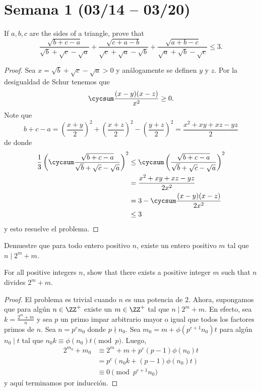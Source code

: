 \section{Semana 1 (03/14 -- 03/20)}


\begin{probEG}[ISL 2006/A5]
  If $a,b,c$ are the sides of a triangle, prove that
  \[
    \frac{\sqrt{b+c-a}}{\sqrt b+\sqrt c-\sqrt a}
    +\frac{\sqrt{c+a-b}}{\sqrt c+\sqrt a-\sqrt b}
    +\frac{\sqrt{a+b-c}}{\sqrt a+\sqrt b-\sqrt c}
    \le 3.
  \]
\end{probEG}

\begin{proof}
  Sea $x=\sqrt b+\sqrt c-\sqrt a>0$ y análogamente se definen $y$ y $z$. Por la
  desigualdad de Schur tenemos que
  \[\cycsum\frac{(x-y)(x-z)}{x^2}\ge 0.\]
  Note que
  \[
    b+c-a
    =\left(\frac{x+y}{2}\right)^2
    +\left(\frac{x+z}{2}\right)^2
    -\left(\frac{y+z}{2}\right)^2
    =\frac{x^2+xy+xz-yz}{2}
  \]
  de donde
  \begin{align*}
    \frac13\left(\cycsum\frac{\sqrt{b+c-a}}{\sqrt b+\sqrt c-\sqrt a}\right)^2
    &\le \cycsum\left(\frac{\sqrt{b+c-a}}{\sqrt b+\sqrt c-\sqrt a}\right)^2 \\
    &= \frac{x^2+xy+xz-yz}{2x^2} \\
    &= 3-\cycsum\frac{(x-y)(x-z)}{2x^2} \\
    &\le 3
  \end{align*}
  y esto resuelve el problema.
\end{proof}

\begin{probEB}[ISL 2006/N7]
  Demuestre que para todo entero positivo $n$, existe un entero positivo $m$ tal
  que $n\mid 2^m+m$.
  \begin{hint}
    For all positive integers $n$, show that there exists a positive integer $m$
    such that $n$ divides $2^m+m$.
  \end{hint}
\end{probEB}

\begin{proof}
  El problema es trivial cuando $n$ es una potencia de $2$. Ahora, supongamos
  que para algún $n\in\ZZ^+$ existe un $m\in\ZZ^+$ tal que $n\mid 2^m+m$. En
  efecto, sea $k=\frac{2^m+m}{n}$ y sea $p$ un primo impar arbitrario mayor o
  igual que todos los factores primos de $n$. Sea $n=p^en_0$ donde $p\nmid n_0$.
  Sea $m_0=m+\phi(p^{e+1}n_0)t$ para algún $n_0\mid t$ tal que
  $n_0k\equiv\phi(n_0)t\pmod p$. Luego,
  \begin{align*}
    2^{m_0}+m_0
    &\equiv 2^m+m+p^e(p-1)\phi(n_0)t \\
    &= p^e\left(n_0k+(p-1)\phi(n_0)t\right) \\
    &\equiv 0\pmod{p^{e+1}n_0}
  \end{align*}
  y aquí terminamos por inducción.
\end{proof}

